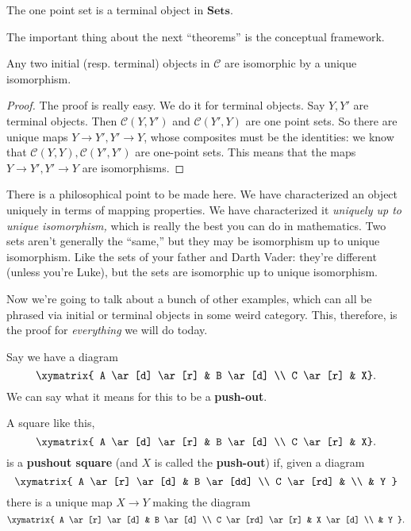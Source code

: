 \begin{example} 
The one point set is a terminal object in $\mathbf{Sets}$. 
\end{example} 

The important thing about the next ``theorems'' is the conceptual framework.
\begin{theorem} 
Any two initial (resp. terminal) objects in $\mathcal{C}$ are isomorphic by a
unique isomorphism.
\end{theorem} 
\begin{proof} 
The proof is really easy. We do it for terminal objects. Say $Y, Y'$ are
terminal objects. Then $\mathcal{C}(Y, Y')$ and $\mathcal{C}(Y', Y)$ are one
point sets. So there are unique maps $Y \to Y', Y' \to Y$, whose composites
must be the identities: we know that $\mathcal{C}(Y, Y) , \mathcal{C}(Y', Y')$
are one-point sets. This means that the maps $Y \to Y', Y' \to Y$ are
isomorphisms. 
\end{proof} 

There is a philosophical point to be made here. We have characterized an object
uniquely in terms of mapping properties. We have characterized it
\emph{uniquely up to unique isomorphism,} which is really the best you can do
in mathematics. Two sets aren't generally the ``same,'' but they may be
isomorphism up to unique isomorphism. Like the sets of your father and Darth
Vader: they're different (unless you're Luke), but the sets are isomorphic up
to unique isomorphism. 

Now we're going to talk about a bunch of other examples, which can all be
phrased via initial or terminal objects in some weird category. This,
therefore, is the proof for \emph{everything} we will do today.

Say we have a diagram
\[ 
\xymatrix{
A \ar[d] \ar[r] &  B \ar[d] \\
C \ar[r] &  X}.
\]
We can say what it means for this to be a \textbf{push-out}.

\begin{definition} 
A square like this,
\[ 
\xymatrix{
A \ar[d] \ar[r] &  B \ar[d] \\
C \ar[r] &  X}.
\]
is a \textbf{pushout square} (and $X$ is called the \textbf{push-out}) if, given a diagram
\[ \xymatrix{
A \ar[r] \ar[d]  &  B \ar[dd] \\ 
C \ar[rd] & \\
& Y
}\]
there is a unique map $X \to Y$ making the diagram
\[ \xymatrix{
A \ar[r] \ar[d]  &  B \ar[d] \\ 
C \ar[rd] \ar[r] & X  \ar[d]  \\
& Y
}.\]
\end{definition} 

